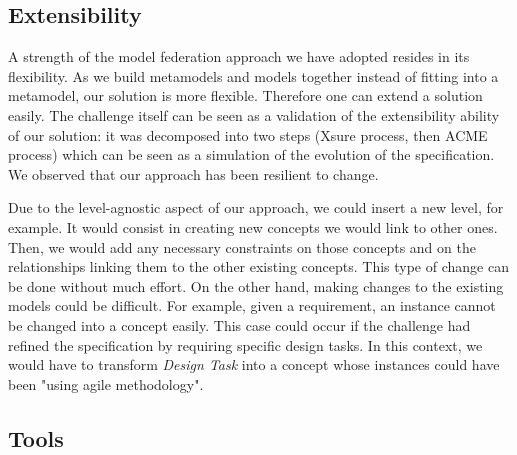   \subsection{Extensibility}


  A strength of the  model federation approach we have adopted resides in its
  flexibility. As we build metamodels and models together instead of fitting
  into a metamodel, our solution is more flexible. Therefore one can extend a
  solution easily. The challenge itself can be seen as a validation of the
  extensibility ability of our solution: it was decomposed into two steps
  (Xsure process, then ACME process) which can be seen as a simulation of the
  evolution of the  specification. We observed that our approach has been
  resilient to change.

  Due to the level-agnostic aspect of our approach, we could insert a new
  level, for example. It would consist in creating new concepts we would link
  to other ones. Then, we would add any necessary constraints on those concepts
  and on the relationships linking them to the other existing concepts. This type 
  of change can be done without much effort. On the other hand, making changes 
  to the existing models could be difficult. For example, given a requirement, 
  an instance cannot be changed into a concept easily. This case could occur if 
  the challenge had refined the specification by requiring specific design tasks. 
  In this context, we would have to transform \emph{Design Task} into a concept 
  whose instances could have been "using agile methodology".
  

  
\subsection{Tools}


